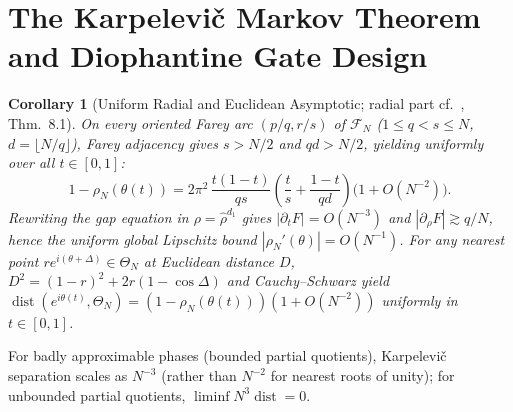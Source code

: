 \documentclass[11pt]{article}
\newtheorem{corollary}[theorem]{Corollary}
\theoremstyle{definition}
\newcommand{\dist}{\operatorname{dist}}
\begin{document}
\section{The Karpelevi\v{c} Markov Theorem and Diophantine Gate Design}

\begin{corollary}[Uniform Radial and Euclidean Asymptotic; radial part cf.\ \cite{VerbekenGinis2026}, Thm.~8.1]\label{cor:asymp}
On every oriented Farey arc $(p/q,r/s)$ of $\mathcal{F}_N$ ($1\le q<s\le N$, $d=\lfloor N/q\rfloor$), Farey adjacency gives $s>N/2$ and $qd>N/2$, yielding uniformly over all $t\in[0,1]$:
\[
 1-\rho_N(\theta(t)) = 2\pi^2\,\frac{t(1-t)}{qs}\!\left(\frac{t}{s}+\frac{1-t}{qd}\right)\bigl(1+O(N^{-2})\bigr).
\]
Rewriting the gap equation in $\rho=\hat{\rho}^{d_1}$ gives $|\partial_t F|=O(N^{-3})$ and $|\partial_\rho F|\gtrsim q/N$, hence the uniform global Lipschitz bound $|\rho_N'(\theta)|=O(N^{-1})$. For any nearest point $re^{i(\theta+\Delta)}\in\Theta_N$ at Euclidean distance $D$, $D^2=(1-r)^2+2r(1-\cos\Delta)$ and Cauchy--Schwarz yield $\dist(e^{i\theta(t)},\Theta_N)=(1-\rho_N(\theta(t)))(1+O(N^{-2}))$ uniformly in $t\in[0,1]$.
\end{corollary}

For badly approximable phases (bounded partial quotients), Karpelevi\v{c} separation scales as $N^{-3}$ (rather than $N^{-2}$ for nearest roots of unity); for unbounded partial quotients, $\liminf N^3\dist=0$.
\end{document}
